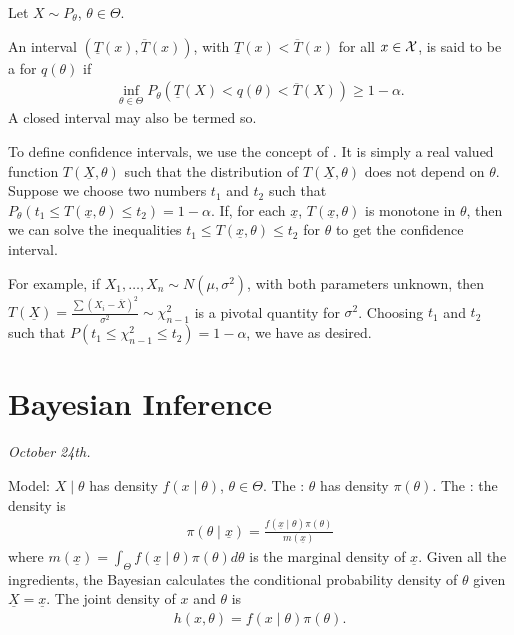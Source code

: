 Let $X \sim P_{\theta}$, $\theta \in \Theta$.

\begin{definition}
    An interval $(\underline{T}(x),\overline{T}(x))$, with $\underline{T}(x) < \overline{T}(x)$ for all $x \in \mathcal{X}$, is said to be a  for $q(\theta)$ if
    \begin{align}
        \inf_{\theta \in \Theta} P_{\theta}(\underline{T}(X) < q(\theta) < \overline{T}(X)) \geq 1 - \alpha.
    \end{align}
    A closed interval may also be termed so.
\end{definition}

To define confidence intervals, we use the concept of . It is simply a real valued function $T(\underline{X},\theta)$ such that the distribution of $T(\underline{X},\theta)$ does not depend on $\theta$. Suppose we choose two numbers $t_{1}$ and $t_{2}$ such that $P_{\theta}(t_{1} \leq T(\underline{x},\theta) \leq t_{2}) = 1-\alpha$. If, for each $\underline{x}$, $T(\underline{x},\theta)$ is monotone in $\theta$, then we can solve the inequalities $t_{1} \leq T(\underline{x},\theta) \leq t_{2}$ for $\theta$ to get the confidence interval.


For example, if $X_{1},\ldots,X_{n} \sim N(\mu,\sigma^{2})$, with both parameters unknown, then $T(\underline{X}) = \frac{\sum (X_{i}-\overline{X})^{2}}{\sigma^{2}} \sim \chi^{2}_{n-1}$ is a pivotal quantity for $\sigma^{2}$. Choosing $t_{1}$ and $t_{2}$ such that $P(t_{1} \leq \chi^{2}_{n-1} \leq t_{2}) = 1-\alpha$, we have as desired.


\section{Bayesian Inference}
\textit{October 24th.}


Model: $X \mid \theta$ has density $f(x \mid \theta)$, $\theta \in \Theta$. The : $\theta$ has density $\pi(\theta)$. The : the density is
\begin{align}
    \pi(\theta \mid \underline{x}) = \frac{f(\underline{x} \mid \theta) \pi(\theta)}{m(\underline{x})}
\end{align}
where $m(\underline{x}) = \int_{\Theta} f(\underline{x} \mid \theta) \pi(\theta) d\theta$ is the marginal density of $\underline{x}$. Given all the ingredients, the Bayesian calculates the conditional probability density of $\theta$ given $\underline{X} = \underline{x}$. The joint density of $x$ and $\theta$ is
\begin{align}
    h(x,\theta) = f(x \mid \theta) \pi(\theta).
\end{align}

